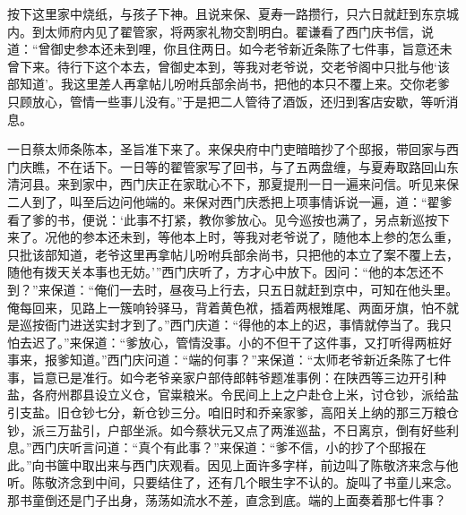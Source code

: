 按下这里家中烧纸，与孩子下神。且说来保、夏寿一路攒行，只六日就赶到东京城内。到太师府内见了翟管家，将两家礼物交割明白。翟谦看了西门庆书信，说道：“曾御史参本还未到哩，你且住两日。如今老爷新近条陈了七件事，旨意还未曾下来。待行下这个本去，曾御史本到，等我对老爷说，交老爷阁中只批与他‘该部知道’。我这里差人再拿帖儿吩咐兵部余尚书，把他的本只不覆上来。交你老爹只顾放心，管情一些事儿没有。”于是把二人管待了酒饭，还归到客店安歇，等听消息。

一日蔡太师条陈本，圣旨准下来了。来保央府中门吏暗暗抄了个邸报，带回家与西门庆瞧，不在话下。一日等的翟管家写了回书，与了五两盘缠，与夏寿取路回山东清河县。来到家中，西门庆正在家耽心不下，那夏提刑一日一遍来问信。听见来保二人到了，叫至后边问他端的。来保对西门庆悉把上项事情诉说一遍，道：“翟爹看了爹的书，便说：‘此事不打紧，教你爹放心。见今巡按也满了，另点新巡按下来了。况他的参本还未到，等他本上时，等我对老爷说了，随他本上参的怎么重，只批该部知道，老爷这里再拿帖儿吩咐兵部余尚书，只把他的本立了案不覆上去，随他有拨天关本事也无妨。’”西门庆听了，方才心中放下。因问：“他的本怎还不到？”来保道：“俺们一去时，昼夜马上行去，只五日就赶到京中，可知在他头里。俺每回来，见路上一簇响铃驿马，背着黄色袱，插着两根雉尾、两面牙旗，怕不就是巡按衙门进送实封才到了。”西门庆道：“得他的本上的迟，事情就停当了。我只怕去迟了。”来保道：“爹放心，管情没事。小的不但干了这件事，又打听得两桩好事来，报爹知道。”西门庆问道：“端的何事？”来保道：“太师老爷新近条陈了七件事，旨意已是准行。如今老爷亲家户部侍郎韩爷题准事例：在陕西等三边开引种盐，各府州郡县设立义仓，官粜粮米。令民间上上之户赴仓上米，讨仓钞，派给盐引支盐。旧仓钞七分，新仓钞三分。咱旧时和乔亲家爹，高阳关上纳的那三万粮仓钞，派三万盐引，户部坐派。如今蔡状元又点了两淮巡盐，不日离京，倒有好些利息。”西门庆听言问道：“真个有此事？”来保道：“爹不信，小的抄了个邸报在此。”向书箧中取出来与西门庆观看。因见上面许多字样，前边叫了陈敬济来念与他听。陈敬济念到中间，只要结住了，还有几个眼生字不认的。旋叫了书童儿来念。那书童倒还是门子出身，荡荡如流水不差，直念到底。端的上面奏着那七件事？


